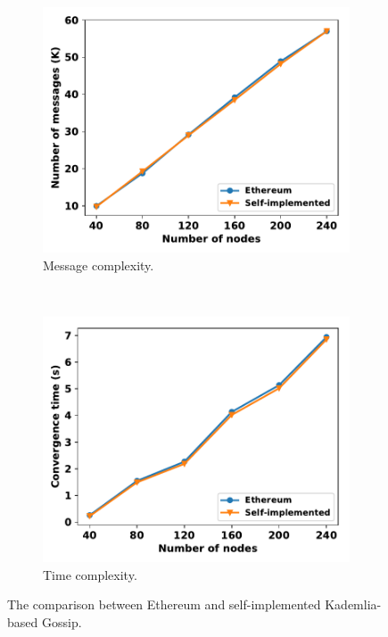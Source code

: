 \begin{figure}[ht]
    \begin{subfigure}[b]{0.23\textwidth}
    \includegraphics[width=\textwidth]{figures/eth_ourgossip_num_msg_on_num_node.pdf}
    \caption{Message complexity.}
    \label{eth_ourgossip_num_msg_on_num_node}
    \end{subfigure}
    ~
    \begin{subfigure}[b]{0.23\textwidth}
	  \includegraphics[width=\textwidth]{figures/eth_ourgossip_cvgtime_on_num_node.pdf}
	  \caption{Time complexity.}
    \label{eth_ourgossip_cvgtime_on_num_node}
    \end{subfigure}

	\caption{The comparison between Ethereum and self-implemented Kademlia-based Gossip.}
	\label{fig_eth_ourgossip}
	\vspace{-0.5cm}
\end{figure}

